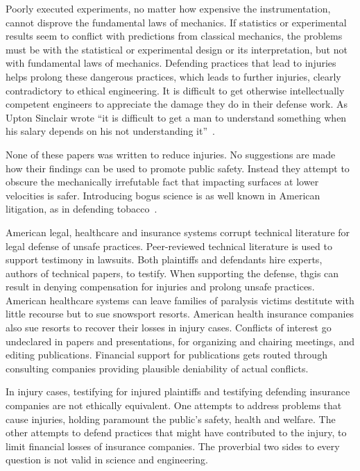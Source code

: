 \documentclass[smallextended]{svjour3}       %
\begin{document}
Poorly executed experiments, no matter how expensive the instrumentation,
cannot disprove the fundamental laws of mechanics. If statistics or
experimental results seem to conflict with predictions from classical
mechanics, the problems must be with the statistical or experimental design or
its interpretation, but not with fundamental laws of mechanics. Defending
practices that lead to injuries helps prolong these dangerous practices, which
leads to further injuries, clearly contradictory to ethical engineering. It is
difficult to get otherwise intellectually competent engineers to appreciate the
damage they do in their defense work. As Upton Sinclair wrote ``it is difficult
to get a man to understand something when his salary depends on his not
understanding it''~\cite{Sinclair1994}.

None of these papers was written to reduce injuries. No suggestions
are made how their findings can be used to promote public safety. Instead they
attempt to obscure the mechanically irrefutable fact that impacting surfaces at
lower velocities is safer. Introducing bogus science is as well known in American
litigation, as in defending tobacco~\cite{Oreskes2010}.

American legal, healthcare and insurance systems corrupt technical literature
for legal defense of unsafe practices. Peer-reviewed technical literature is
used to support testimony in lawsuits. Both plaintiffs and defendants hire
experts, authors of technical papers, to testify.  When supporting the
defense, thgis can result in denying compensation for injuries and prolong unsafe
practices. American healthcare systems can leave families of paralysis victims
 destitute with little recourse but to sue snowsport resorts. American
health insurance companies also sue resorts to recover their losses in injury
cases. Conflicts of interest go undeclared in papers and presentations, for
organizing and chairing meetings, and editing publications. Financial support for
publications gets routed through consulting companies providing plausible
deniability of actual conflicts.

In injury cases, testifying for injured plaintiffs and testifying defending
insurance companies are not ethically equivalent. One attempts to address
problems that cause injuries, holding paramount the public's safety, health and 
welfare. The other attempts to defend practices that might have
contributed to the injury, to limit financial losses of insurance
companies. The proverbial two sides to every question is not valid in science
and engineering.
\end{document}
